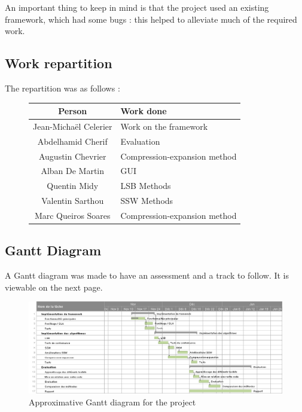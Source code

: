 An important thing to keep in mind is that the project used an existing framework, which had some bugs : this helped to alleviate much of the required work.

\subsection{Work repartition}
The repartition was as follows : 
\begin{figure}[h!]
\centering
\begin{tabular}{|c|l|}
\hline
Person & Work done \\
\hline
Jean-Michaël Celerier & Work on the framework \\
Abdelhamid Cherif & Evaluation \\
Augustin Chevrier & Compression-expansion method \\
Alban De Martin & \ac{GUI} \\
Quentin Midy & \ac{LSB} Methods \\
Valentin Sarthou & \ac{SSW} Methods \\
Marc Queiros Soares & Compression-expansion method \\
\hline
\end{tabular}
\end{figure}

\subsection{Gantt Diagram}
A Gantt diagram was made to have an assessment and a track to follow. It is viewable on the next page.

\begin{figure}
\centering
\includegraphics[scale=0.65]{images/gantt.png}
\caption{Approximative Gantt diagram for the project}
\label{gantt}
\end{figure}

